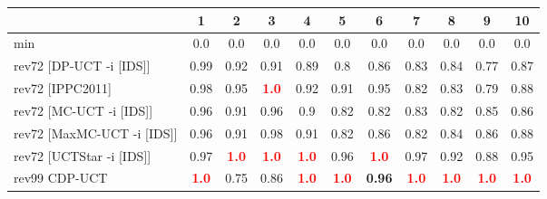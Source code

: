 \documentclass{article}
\begin{document}
\begin{tabular}{|l|r@{$\pm$}rr@{$\pm$}rr@{$\pm$}rr@{$\pm$}rr@{$\pm$}rr@{$\pm$}rr@{$\pm$}rr@{$\pm$}rr@{$\pm$}rr@{$\pm$}r|}
\hline

& \multicolumn{2}{c}{1}
& \multicolumn{2}{c}{2}
& \multicolumn{2}{c}{3}
& \multicolumn{2}{c}{4}
& \multicolumn{2}{c}{5}
& \multicolumn{2}{c}{6}
& \multicolumn{2}{c}{7}
& \multicolumn{2}{c}{8}
& \multicolumn{2}{c}{9}
& \multicolumn{2}{c|}{10}
\\
\hline
\hline
min
& \multicolumn{2}{c}{0.0}
& \multicolumn{2}{c}{0.0}
& \multicolumn{2}{c}{0.0}
& \multicolumn{2}{c}{0.0}
& \multicolumn{2}{c}{0.0}
& \multicolumn{2}{c}{0.0}
& \multicolumn{2}{c}{0.0}
& \multicolumn{2}{c}{0.0}
& \multicolumn{2}{c}{0.0}
& \multicolumn{2}{c|}{0.0}
\\
rev72 [DP-UCT -i [IDS]]
& \multicolumn{2}{c}{0.99}
& \multicolumn{2}{c}{0.92}
& \multicolumn{2}{c}{0.91}
& \multicolumn{2}{c}{0.89}
& \multicolumn{2}{c}{0.8}
& \multicolumn{2}{c}{0.86}
& \multicolumn{2}{c}{0.83}
& \multicolumn{2}{c}{0.84}
& \multicolumn{2}{c}{0.77}
& \multicolumn{2}{c|}{0.87}
\\
rev72 [IPPC2011]
& \multicolumn{2}{c}{0.98}
& \multicolumn{2}{c}{0.95}
& \multicolumn{2}{c}{\textbf{\textcolor{red}{1.0}}}
& \multicolumn{2}{c}{0.92}
& \multicolumn{2}{c}{0.91}
& \multicolumn{2}{c}{0.95}
& \multicolumn{2}{c}{0.82}
& \multicolumn{2}{c}{0.83}
& \multicolumn{2}{c}{0.79}
& \multicolumn{2}{c|}{0.88}
\\
rev72 [MC-UCT -i [IDS]]
& \multicolumn{2}{c}{0.96}
& \multicolumn{2}{c}{0.91}
& \multicolumn{2}{c}{0.96}
& \multicolumn{2}{c}{0.9}
& \multicolumn{2}{c}{0.82}
& \multicolumn{2}{c}{0.82}
& \multicolumn{2}{c}{0.83}
& \multicolumn{2}{c}{0.82}
& \multicolumn{2}{c}{0.85}
& \multicolumn{2}{c|}{0.86}
\\
rev72 [MaxMC-UCT -i [IDS]]
& \multicolumn{2}{c}{0.96}
& \multicolumn{2}{c}{0.91}
& \multicolumn{2}{c}{0.98}
& \multicolumn{2}{c}{0.91}
& \multicolumn{2}{c}{0.82}
& \multicolumn{2}{c}{0.86}
& \multicolumn{2}{c}{0.82}
& \multicolumn{2}{c}{0.84}
& \multicolumn{2}{c}{0.86}
& \multicolumn{2}{c|}{0.88}
\\
rev72 [UCTStar -i [IDS]]
& \multicolumn{2}{c}{0.97}
& \multicolumn{2}{c}{\textbf{\textcolor{red}{1.0}}}
& \multicolumn{2}{c}{\textbf{\textcolor{red}{1.0}}}
& \multicolumn{2}{c}{\textbf{\textcolor{red}{1.0}}}
& \multicolumn{2}{c}{0.96}
& \multicolumn{2}{c}{\textbf{\textcolor{red}{1.0}}}
& \multicolumn{2}{c}{0.97}
& \multicolumn{2}{c}{0.92}
& \multicolumn{2}{c}{0.88}
& \multicolumn{2}{c|}{0.95}
\\
\hline
rev99 CDP-UCT
& \multicolumn{2}{c}{\textbf{\textcolor{red}{1.0}}}
& \multicolumn{2}{c}{0.75}
& \multicolumn{2}{c}{0.86}
& \multicolumn{2}{c}{\textbf{\textcolor{red}{1.0}}}
& \multicolumn{2}{c}{\textbf{\textcolor{red}{1.0}}}
& \multicolumn{2}{c}{\textbf{0.96}}
& \multicolumn{2}{c}{\textbf{\textcolor{red}{1.0}}}
& \multicolumn{2}{c}{\textbf{\textcolor{red}{1.0}}}
& \multicolumn{2}{c}{\textbf{\textcolor{red}{1.0}}}
& \multicolumn{2}{c|}{\textbf{\textcolor{red}{1.0}}}
\\
\hline
\end{tabular}%
\end{document}
